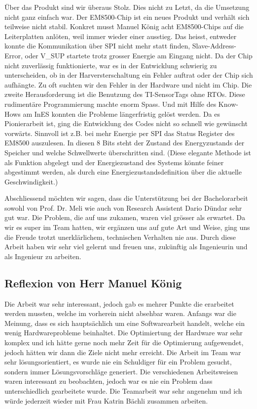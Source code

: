 Über das Produkt sind wir überaus Stolz. Dies nicht zu Letzt, da die Umsetzung nicht ganz einfach war. Der EM8500-Chip ist ein neues Produkt und verhält sich teilweise nicht stabil. Konkret musst Manuel König acht EM8500-Chips auf die Leiterplatten anlöten, weil immer wieder einer ausstieg. Das heisst, entweder konnte die Kommunikation über SPI nicht mehr statt finden, Slave-Address-Error, oder V_SUP startete trotz grosser Energie am Eingang nicht. Da der Chip nicht zuverlässig funktionierte, war es in der Entwicklung schwierig zu unterscheiden, ob in der Harversterschaltung ein Fehler auftrat oder der Chip sich aufhängte. Zu oft suchten wir den Fehler in der Hardware und nicht im Chip. Die zweite Herausforderung ist die Benutzung des TI-SensorTags ohne RTOs. Diese rudimentäre Programmierung machte enorm Spass. Und mit Hilfe des Know-Hows am InES konnten die Probleme längerfristig gelöst werden. Da es Pionierarbeit ist, ging die Entwicklung des Codes nicht so schnell wie gewünscht vorwärts. Sinnvoll ist z.B. bei mehr Energie per SPI das Status Register des EM8500 auszulesen. In diesen 8 Bits steht der Zustand des Energyzustands der Speicher und welche Schwellwerte überschritten sind. 
(Diese elegante Methode ist als Funktion abgelegt und der Energiezustand des Systems könnte feiner abgestimmt werden, als durch eine Energiezustandsdefinition über die aktuelle Geschwindigkeit.)

Abschliessend möchten wir sagen, dass die Unterstützung bei der Bachelorarbeit sowohl von Prof. Dr. Meli wie auch von Research Assistent Dario Dündar sehr gut war. Die Problem, die auf uns zukamen, waren viel grösser als erwartet. Da wir es super im Team hatten, wir ergänzen uns auf gute Art und Weise, ging uns die Freude trotzt unerklärlichem, technischen Verhalten nie aus. Durch diese Arbeit haben wir sehr viel gelernt und freuen uns, zukünftig als Ingenieurin und als Ingenieur zu arbeiten.





\subsection{Reflexion von Herr Manuel König}
Die Arbeit war sehr interessant, jedoch gab es mehrer Punkte die erarbeitet werden mussten, welche im vorherein nicht absehbar waren. Anfangs war die Meinung, dass es sich hauptsächlich um eine Softwarearbeit handelt, welche ein wenig Hardwareprobleme beinhaltet. Die Optimiertung der Hardware war sehr komplex und ich hätte gerne noch mehr Zeit für die Optimierung aufgewendet, jedoch hätten wir dann die Ziele nicht mehr erreicht. Die Arbeit im Team war sehr lösungsorientiert, es wurde nie ein Schuldiger für ein Problem gesucht, sondern immer Lösungsvorschläge generiert. Die verschiedenen Arbeitsweisen waren interessant zu beobachten, jedoch war es nie ein Problem dass unterschiedlich gearbeitete wurde. Die Teamarbeit war sehr angenehm und ich würde jederzeit wieder mit Frau Katrin Bächli zusammen arbeiten.

